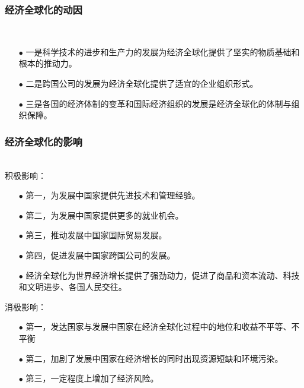 \documentclass{ctexart}
\begin{document}
\subsubsection{经济全球化的动因}~{}
\vspace{-5mm}
\begin{itemize}
\item[$\bullet$]一是科学技术的进步和生产力的发展为经济全球化提供了坚实的物质基础和根本的推动力。
\item[$\bullet$]二是跨国公司的发展为经济全球化提供了适宜的企业组织形式。
\item[$\bullet$]三是各国的经济体制的变革和国际经济组织的发展是经济全球化的体制与组织保障。
\end{itemize}


\subsubsection{经济全球化的影响}~{}
\vspace{-5mm}
\\
积极影响：
\begin{itemize}
\item[$\bullet$]第一，为发展中国家提供先进技术和管理经验。
\item[$\bullet$]第二，为发展中国家提供更多的就业机会。
\item[$\bullet$]第三，推动发展中国家国际贸易发展。
\item[$\bullet$]第四，促进发展中国家跨国公司的发展。
\item[$\bullet$]经济全球化为世界经济增长提供了强劲动力，促进了商品和资本流动、科技和文明进步、各国人民交往。
\end{itemize}
消极影响：
\begin{itemize}
    \item[$\bullet$]第一，发达国家与发展中国家在经济全球化过程中的地位和收益不平等、不平衡
    \item[$\bullet$]第二，加剧了发展中国家在经济增长的同时出现资源短缺和环境污染。
    \item[$\bullet$]第三，一定程度上增加了经济风险。
    \end{itemize}
\end{document}
